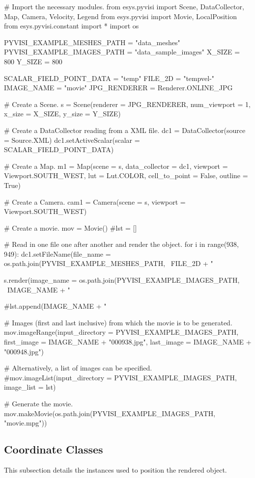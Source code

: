 \begin{python}
# Import the necessary modules.
from esys.pyvisi import Scene, DataCollector, Map, Camera, Velocity, Legend 
from esys.pyvisi import Movie, LocalPosition
from esys.pyvisi.constant import *
import os

PYVISI_EXAMPLE_MESHES_PATH = "data_meshes"
PYVISI_EXAMPLE_IMAGES_PATH = "data_sample_images"
X_SIZE = 800
Y_SIZE = 800

SCALAR_FIELD_POINT_DATA = "temp"
FILE_2D = "tempvel-"
IMAGE_NAME = "movie"
JPG_RENDERER = Renderer.ONLINE_JPG

# Create a Scene.
s = Scene(renderer = JPG_RENDERER, num_viewport = 1, x_size = X_SIZE, 
        y_size = Y_SIZE)

# Create a DataCollector reading from a XML file. 
dc1 = DataCollector(source = Source.XML)
dc1.setActiveScalar(scalar = SCALAR_FIELD_POINT_DATA)

# Create a Map.
m1 = Map(scene = s, data_collector = dc1, 
        viewport = Viewport.SOUTH_WEST, lut = Lut.COLOR, cell_to_point = False,
        outline = True)

# Create a Camera.
cam1 = Camera(scene = s, viewport = Viewport.SOUTH_WEST)

# Create a movie.
mov = Movie()
#lst = []

# Read in one file one after another and render the object. 
for i in range(938, 949):
    dc1.setFileName(file_name =  os.path.join(PYVISI_EXAMPLE_MESHES_PATH, \
	        FILE_2D + "%

    s.render(image_name = os.path.join(PYVISI_EXAMPLE_IMAGES_PATH, \
            IMAGE_NAME + "%

    #lst.append(IMAGE_NAME + "%

# Images (first and last inclusive) from which the movie is to be generated.
mov.imageRange(input_directory = PYVISI_EXAMPLE_IMAGES_PATH, 
        first_image = IMAGE_NAME + "000938.jpg", 
        last_image = IMAGE_NAME + "000948.jpg")

# Alternatively, a list of images can be specified.
#mov.imageList(input_directory = PYVISI_EXAMPLE_IMAGES_PATH, image_list = lst)

# Generate the movie.
mov.makeMovie(os.path.join(PYVISI_EXAMPLE_IMAGES_PATH, "movie.mpg"))
\end{python}




\subsection{Coordinate Classes}
This subsection details the instances used to position the rendered object.

